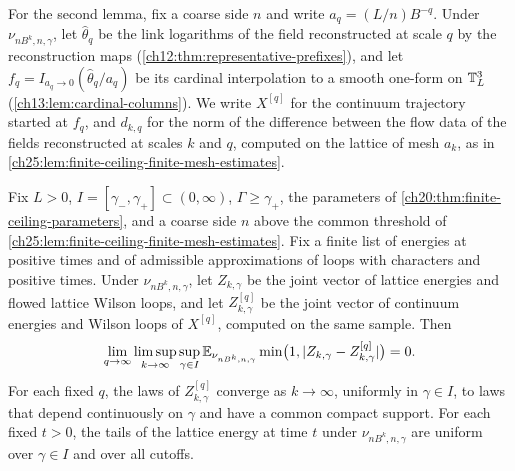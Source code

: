 For the second lemma, fix a coarse side $n$ and write $a_q=(L/n)B^{-q}$. Under $\nu_{nB^k,n,\gamma}$, let $\widehat\theta_q$ be the link logarithms of the field reconstructed at scale $q$ by the reconstruction maps (\cref{ch12:thm:representative-prefixes}), and let $f_q=I_{a_q\to0}(\widehat\theta_q/a_q)$ be its cardinal interpolation to a smooth one-form on $\mathbb T_L^3$ (\cref{ch13:lem:cardinal-columns}). We write $X^{[q]}$ for the continuum trajectory started at $f_q$, and $d_{k,q}$ for the norm of the difference between the flow data of the fields reconstructed at scales $k$ and $q$, computed on the lattice of mesh $a_k$, as in \cref{ch25:lem:finite-ceiling-finite-mesh-estimates}.

\begin{lemma}\label{ch26:lem:compact-coupling-smooth-prefix-approximation}
Fix $L>0$, $I=[\gamma_-,\gamma_+]\subset(0,\infty)$, $\Gamma\ge\gamma_+$, the parameters of \cref{ch20:thm:finite-ceiling-parameters}, and a coarse side $n$ above the common threshold of \cref{ch25:lem:finite-ceiling-finite-mesh-estimates}. Fix a finite list of energies at positive times and of admissible approximations of loops with characters and positive times. Under $\nu_{nB^k,n,\gamma}$, let $Z_{k,\gamma}$ be the joint vector of lattice energies and flowed lattice Wilson loops, and let $Z^{[q]}_{k,\gamma}$ be the joint vector of continuum energies and Wilson loops of $X^{[q]}$, computed on the same sample. Then
\begin{equation}\label{ch26:eq:compact-coupling-smooth-prefix-error}
 \lim_{q\to\infty}\limsup_{k\to\infty}\sup_{\gamma\in I}\mathbb E_{\nu_{nB^k,n,\gamma}}\min\bigl(1,\lvert Z_{k,\gamma}-Z^{[q]}_{k,\gamma}\rvert\bigr)=0.
\end{equation}
For each fixed $q$, the laws of $Z^{[q]}_{k,\gamma}$ converge as $k\to\infty$, uniformly in $\gamma\in I$, to laws that depend continuously on $\gamma$ and have a common compact support. For each fixed $t>0$, the tails of the lattice energy at time $t$ under $\nu_{nB^k,n,\gamma}$ are uniform over $\gamma\in I$ and over all cutoffs.
\end{lemma}

